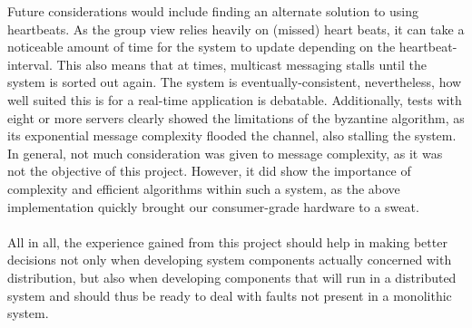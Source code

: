 \documentclass[runningheads]{llncs}
\begin{document}
Future considerations would include finding an alternate solution to using heartbeats. As the group view relies heavily on (missed) heart beats, it can take a noticeable amount of time for the system to update depending on the heartbeat-interval.
This also means that at times, multicast messaging stalls until the system is sorted out again. The system is eventually-consistent, nevertheless, how well suited this is for a real-time application is debatable.
Additionally, tests with eight or more servers clearly showed the limitations of the byzantine algorithm, as its exponential message complexity flooded the channel, also stalling the system.
In general, not much consideration was given to message complexity, as it was not the objective of this project. However, it did show the importance of complexity and efficient algorithms within such a system, as the above implementation quickly brought our consumer-grade hardware to a sweat.
\\\\
All in all, the experience gained from this project should help in making better decisions not only when developing system components actually concerned with distribution, but also when developing components that will run in a distributed system and should thus be ready to deal with faults not present in a monolithic system.
\end{document}
